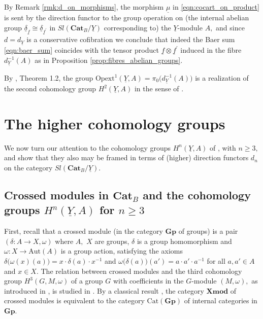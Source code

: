 \documentclass[11pt]{amsart}
\theoremstyle{plain}
\theoremstyle{definition}
\theoremstyle{remark}
\newcommand{\un}{\underline}
\begin{document}
By Remark \ref{rmk:d_on_morphisms}, the morphism $\un{\mu}$ in \eqref{eqn:cocart_on_product} is sent by the direction functor to the group operation on (the internal abelian group $\un{\delta}_{\un{f}}\cong\un{\delta}_{\un{f}^\prime}$ in $Sl(\mathbf{Cat}_B/\un{Y})$ corresponding to) the $\un{Y}$-module $A,$ and since $d=d_{\un{Y}}$ is a conservative cofibration we conclude that indeed the Baer sum \eqref{eqn:baer_sum} coincides with the tensor product $\un{f}\otimes\un{f}^\prime$ induced in the fibre $d_{\un{Y}}^{-1}(A)$ as in Proposition \ref{prop:fibres_abelian_groups}.

By \cite{golasinski}, Theorem 1.2, the group $\mathrm{Opext}^1(\un{Y},A)=\pi_0\big(d_{\un{Y}}^{-1}(A)\big)$ is a realization of the second cohomology group $H^2(\un{Y},A)$ in the sense of \cite{cocat}.
\section{The higher cohomology groups} \label{section higher cohomology}
We now turn our attention to the cohomology groups $H^n(\un{Y},A)$ of \cite{cocat, golasinski}, with $n\geq 3,$ and show that they also may be framed in terms of (higher) direction functors $d_n$ on the category $Sl(\mathbf{Cat}_B/\un{Y}).$
\subsection{Crossed modules in $\mathbf{Cat}_B$ and the cohomology groups $H^n(\un{Y},A)$ for $n\geq 3$}
First, recall that a crossed module \cite{whitehead_1, whitehead_2} (in the category $\mathbf{Gp}$ of groups) is a pair $(\delta\colon A\rightarrow X,\omega)$ where $A,$ $X$ are groups, $\delta$ is a group homomorphism and $\omega\colon X\rightarrow\mathrm{Aut}(A)$ is a group action, satisfying the axioms $\delta\big(\omega(x)(a)\big)=x\cdot\delta(a)\cdot x^{-1}$ and $\omega\big(\delta(a)\big)(a')=a\cdot a'\cdot a^{-1}$ for all $a,a'\in A$ and $x\in X.$ The relation between crossed modules and the third cohomology group $H^3(G,M,\omega)$ of a group $G$ with coefficients in the $G$-module $(M,\omega),$ as introduced in \cite{EML}, is studied in \cite{holt, huebschmann}. By a classical result  \cite{BS}, the category $\mathbf{Xmod}$ of crossed modules is equivalent to the category $\mathrm{Cat}(\mathbf{Gp})$ of internal categories in $\mathbf{Gp}.$
\end{document}
